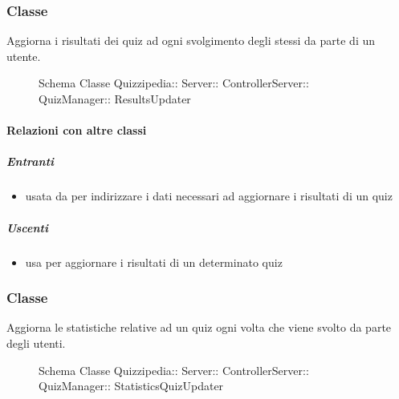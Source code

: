 \subsubsection{Classe }
Aggiorna i risultati dei quiz ad ogni svolgimento degli stessi da parte di un utente.
\begin{figure}[H]
\centering
\noindent{}
\caption[Schema Classe ResultsUpdater]{Schema Classe Quizzipedia:: Server:: ControllerServer:: QuizManager:: ResultsUpdater}
\end{figure}
\paragraph{Relazioni con altre classi}
\subparagraph{Entranti}
\begin{itemize}
\item usata da  per indirizzare i dati necessari ad aggiornare i risultati di un quiz
\end{itemize}
\subparagraph{Uscenti}
\begin{itemize}
\item usa  per aggiornare i risultati di un determinato quiz
\end{itemize}
\subsubsection{Classe }
Aggiorna le statistiche relative ad un quiz ogni volta che viene svolto da parte degli utenti.
\begin{figure}[H]
\centering
\noindent{}
\caption[Schema Classe StatisticsQuizUpdater]{Schema Classe Quizzipedia:: Server:: ControllerServer:: QuizManager:: StatisticsQuizUpdater}
\end{figure}

